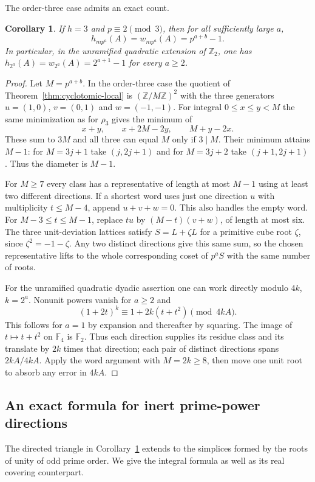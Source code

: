 \documentclass[11pt,letterpaper]{article}
\newtheorem{corollary}[corollary]{Corollary}
\theoremstyle{definition}
\numberwithin{equation}{section}
\begin{document}
The order-three case admits an exact count.
\begin{corollary}\label{cor:local-triangular}
If $h=3$ and $p\equiv2\pmod3$, then for all sufficiently large $a$,
\[
                 h_{mp^a}(A)=w_{mp^a}(A)=p^{a+b}-1 .
\]
In particular, in the unramified quadratic extension of $\mathbb Z_2$,
one has $h_{2^a}(A)=w_{2^a}(A)=2^{a+1}-1$ for every $a\ge2$.
\end{corollary}
\begin{proof}
Let $M=p^{a+b}$. In the order-three case the quotient of
Theorem~\ref{thm:cyclotomic-local} is $(\mathbb Z/M\mathbb Z)^2$
with the three generators $u=(1,0)$, $v=(0,1)$ and $w=(-1,-1)$.
For integral $0\le x\le y<M$ the same minimization as for
$\rho_3$ gives the minimum of
\[
             x+y,\qquad x+2M-2y,\qquad M+y-2x .
\]
These sum to $3M$ and all three can equal $M$ only if $3\mid M$.
Their minimum attains $M-1$: for $M=3j+1$ take $(j,2j+1)$
and for $M=3j+2$ take $(j+1,2j+1)$. Thus the diameter is $M-1$.

For $M\ge7$ every class has a representative of length at most $M-1$
using at least two different directions. If a shortest word uses just
one direction $u$ with multiplicity $t\le M-4$, append $u+v+w=0$.
This also handles the empty word. For $M-3\le t\le M-1$, replace
$tu$ by $(M-t)(v+w)$, of length at most six. The three unit-deviation
lattices satisfy $S=L+\zeta L$ for a primitive cube root $\zeta$,
since $\zeta^2=-1-\zeta$. Any two distinct directions give this
same sum, so the chosen representative lifts to the whole corresponding
coset of $p^a S$ with the same number of roots.

For the unramified quadratic dyadic assertion one can work directly
modulo $4k$, $k=2^a$. Nonunit powers vanish for $a\ge2$ and
\[
        (1+2t)^k\equiv1+2k(t+t^2)\pmod{4kA}.
\]
This follows for $a=1$ by expansion and thereafter by squaring.
The image of $t\mapsto t+t^2$ on $\mathbb F_4$ is $\mathbb F_2$.
Thus each direction supplies its residue class and its translate by
$2k$ times that direction; each pair of distinct directions spans
$2kA/4kA$. Apply the word argument with $M=2k\ge8$, then move
one unit root to absorb any error in $4kA$.
\end{proof}

\subsection{An exact formula for inert prime-power directions}
\label{sec:local-simplex}
The directed triangle in Corollary~\ref{cor:local-triangular} extends
to the simplices formed by the roots of unity of odd prime order.
We give the integral formula as well as its real covering counterpart.
\end{document}
